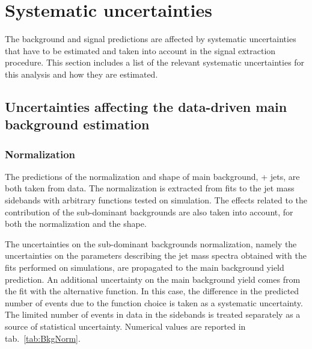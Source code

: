 \section{Systematic uncertainties}
\label{sec:uncertainties}

The background and signal predictions are affected by systematic uncertainties that have to be estimated and taken into account in the signal extraction procedure. This section includes a list of the relevant systematic uncertainties for this analysis and how they are estimated.%


\subsection{Uncertainties affecting the data-driven main background estimation}

\subsubsection{Normalization}

The predictions of the normalization and shape of main background, \V + jets, are both taken from data. The normalization is extracted from fits to the jet mass sidebands with arbitrary functions tested on simulation. The effects related to the contribution of the sub-dominant backgrounds are also taken into account, for both the normalization and the shape.

\noindent The uncertainties on the sub-dominant backgrounds normalization, namely the uncertainties on the parameters describing the jet mass spectra obtained with the fits performed on simulations, are propagated to the main background yield prediction. An additional uncertainty on the main background yield comes from the fit with the alternative function. In this case, the difference in the predicted number of events due to the function choice is taken as a systematic uncertainty. The limited number of events in data in the sidebands is treated separately as a source of statistical uncertainty. Numerical values are reported in tab.~\ref{tab:BkgNorm}.


